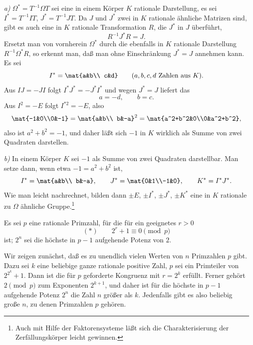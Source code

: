 \emph{a)} $\Omega^*=T^{-1}\Omega T$ sei eine in einem Körper $K$ rationale Darstellung, es sei $I^*=T^{-1}IT$, $J^*=T^{-1}JT$. Da $J$ und $J^*$ zwei in $K$ rationale ähnliche Matrizen sind, gibt es auch eine in $K$ rationale Transformation $R$, die $J^*$ in $J$ überführt,
\[
        R^{-1}J^*R=J.
\]
Ersetzt man von vornherein $\Omega^*$ durch die ebenfalls in $K$ rationale Darstellung $R^{-1}\Omega^*R$, so erkennt man, daß man ohne Einschränkung $J^*=J$ annehmen kann. Es sei
\[
        I^*=\mat{a&b\\ c&d}\qquad (a,b,c,d\text{ Zahlen aus }K).
\]
Aus $IJ=-JI$ folgt $I^*J^*=-J^*I^*$ und wegen $J^*=J$ liefert das
\[
        a=-d,
        \qquad b=c.
\]
Aus $I^2=-E$ folgt $I^{*2}=-E$, also
\[
        \mat{-1&0\\0&-1}=\mat{a&b\\ b&-a}^2
        =\mat{a^2+b^2&0\\0&a^2+b^2},
\]
also ist $a^2+b^2=-1$, und daher läßt sich $-1$ in $K$ wirklich als Summe von zwei Quadraten darstellen.

\emph{b)} In einem Körper $K$ sei $-1$ als Summe von zwei Quadraten darstellbar. Man setze dann, wenn etwa $-1=a^2+b^2$ ist,
\[
        I^*=\mat{a&b\\ b&-a},\qquad
        J^*=\mat{0&1\\-1&0},\qquad
        K^*=I^*J^*.
\]
Wie man leicht nachrechnet, bilden dann $\pm E$, $\pm I^*$, $\pm J^*$, $\pm K^*$ eine in $K$ rationale zu $\Omega$ ähnliche Gruppe.\footnote{Auch mit Hilfe der Faktorensysteme läßt sich die Charakterisierung der Zerfällungskörper leicht gewinnen.}


Es sei $p$ eine rationale Primzahl, für die für ein geeignetes $r>0$
\[
        (*)\qquad 2^r+1\equiv0\pmod p
\]
ist; $2^n$ sei die höchste in $p-1$ aufgehende Potenz von $2$.

Wir zeigen zunächst, daß es zu unendlich vielen Werten von $n$ Primzahlen $p$ gibt. Dazu sei $k$ eine beliebige ganze rationale positive Zahl, $p$ sei ein Primteiler von $2^{2^k}+1$. Dann ist die für $p$ geforderte Kongruenz mit $r=2^k$ erfüllt. Ferner gehört $2\pmod p$ zum Exponenten $2^{k+1}$, und daher ist für die höchste in $p-1$ aufgehende Potenz $2^n$ die Zahl $n$ größer als $k$. Jedenfalls gibt es also beliebig große $n$, zu denen Primzahlen $p$ gehören.

